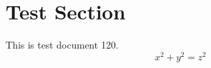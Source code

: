 \documentclass{article}
\begin{document}
\section{Test Section}
This is test document 120.
\begin{equation}
x^2 + y^2 = z^2
\end{equation}
\end{document}
